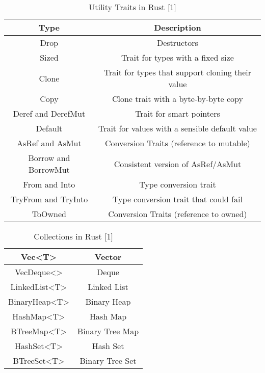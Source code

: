 \documentclass[sigconf,authorversion,nonacm]{acmart}
\begin{document}
\begin{table} [H] 
\caption{Utility Traits in Rust [1]} 
    \begin{tabular}{ |c|c| }
    \hline
    Type & Description \\
    \hline
    Drop & Destructors \\
    \hline
    Sized & Trait for types with a fixed size \\
    \hline
    Clone & Trait for types that support cloning their value \\
    \hline
    Copy & Clone trait with a byte-by-byte copy \\
    \hline
    Deref and DerefMut & Trait for smart pointers \\
    \hline
    Default & Trait for values with a sensible default value \\
    \hline
    AsRef and AsMut & Conversion Traits (reference to mutable) \\
    \hline
    Borrow and BorrowMut & Consistent version of AsRef/AsMut \\
    \hline
    From and Into & Type conversion trait \\
    \hline
    TryFrom and TryInto & Type conversion trait that could fail \\
    \hline
    ToOwned & Conversion Traits (reference to owned) \\
    \hline
    \end{tabular}
\end{table}

\begin{table} [H]
\caption{Collections in Rust [1]}
    \begin{tabular}{ |c|c| }
    \hline
    Vec<T> & Vector \\
    \hline
    VecDeque<> & Deque \\
    \hline
    LinkedList<T> & Linked List \\
    \hline
    BinaryHeap<T> & Binary Heap \\
    \hline
    HashMap<T> & Hash Map \\
    \hline
    BTreeMap<T> & Binary Tree Map \\
    \hline
    HashSet<T> & Hash Set \\
    \hline
    BTreeSet<T> & Binary Tree Set \\
    \hline
    \end{tabular}
\end{table}
\end{document}
